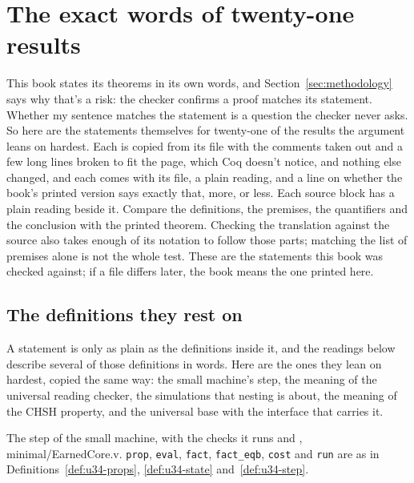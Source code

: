 \section{The exact words of twenty-one results}
\label{sec:coq-statements}

This book states its theorems in its own words, and Section~\ref{sec:methodology} says why that's a
risk: the checker confirms a proof matches its statement. Whether my sentence matches the
statement is a question the checker never asks. So here are the statements themselves for twenty-one of the results the argument
leans on hardest. Each is copied from its file with the comments taken out and a few long lines
broken to fit the page, which Coq doesn't notice, and nothing else changed, and each comes with its file, a plain reading, and a line on whether the book's
printed version says exactly that, more, or less. Each source block has a plain reading beside it. Compare the definitions, the premises,
the quantifiers and the conclusion with the printed theorem. Checking the translation
against the source also takes enough of its notation to follow those parts; matching
the list of premises alone is not the whole test. These are the statements this book was checked against; if a
file differs later, the book means the one printed here.

\subsection{The definitions they rest on}
\label{sec:coq-definitions}

A statement is only as plain as the definitions inside it, and the readings below describe several
of those definitions in words. Here are the ones they lean on hardest, copied the same way: the
small machine's step, the meaning of the universal reading checker, the
simulations that nesting is about, the meaning of the CHSH property, and the universal base with
the interface that carries it.

{\raggedright The step of the small machine, with the checks it runs and ,
minimal/EarnedCore.v. \texttt{prop}, \texttt{eval}, \texttt{fact}, \texttt{fact\_eqb}, \texttt{cost}
and \texttt{run} are as in Definitions~\ref{def:u34-props}, \ref{def:u34-state} and~\ref{def:u34-step}.\par}

